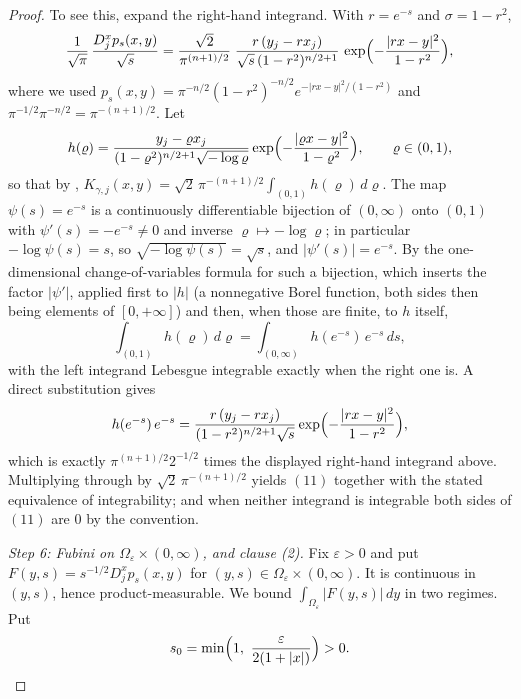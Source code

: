 \begin{proof}
To see this, expand the right-hand integrand.  With $r = e^{-s}$ and
$\sigma = 1-r^2$,
\[
  \frac{1}{\sqrt\pi}\,\frac{D_j^xp_s(x,y)}{\sqrt s}
    = \frac{\sqrt2}{\pi^{(n+1)/2}}\;
      \frac{r\,(y_j-rx_j)}{\sqrt s\,(1-r^2)^{n/2+1}}\,
      \exp\Bigl(-\frac{|rx-y|^2}{1-r^2}\Bigr) ,
\]
where we used $p_s(x,y) = \pi^{-n/2}(1-r^2)^{-n/2}e^{-|rx-y|^2/(1-r^2)}$ and
$\pi^{-1/2}\pi^{-n/2} = \pi^{-(n+1)/2}$.  Let
\[
  h(\varrho) = \frac{y_j - \varrho x_j}{(1-\varrho^2)^{n/2+1}\sqrt{-\log \varrho}}
     \exp\Bigl(-\frac{|\varrho x-y|^2}{1-\varrho^2}\Bigr),
  \qquad \varrho \in (0,1) ,
\]
so that by ,
$K_{\gamma,j}(x,y) = \sqrt2\,\pi^{-(n+1)/2}\int_{(0,1)}h(\varrho)\,d\varrho$.
The map $\psi(s) = e^{-s}$ is a continuously differentiable bijection of
$(0,\infty)$ onto $(0,1)$ with $\psi'(s) = -e^{-s} \neq 0$ and inverse
$\varrho \mapsto -\log\varrho$; in particular $-\log\psi(s) = s$, so
$\sqrt{-\log\psi(s)} = \sqrt s$, and $|\psi'(s)| = e^{-s}$.  By the
one-dimensional change-of-variables formula for such a bijection, which inserts
the factor $|\psi'|$, applied first to $|h|$ (a nonnegative Borel function, both
sides then being elements of $[0,+\infty]$) and then, when those are finite, to
$h$ itself,
\[
  \int_{(0,1)}h(\varrho)\,d\varrho = \int_{(0,\infty)}h(e^{-s})\,e^{-s}\,ds ,
\]
with the left integrand Lebesgue integrable exactly when the right one is.  A
direct substitution gives
\[
  h(e^{-s})\,e^{-s}
    = \frac{r\,(y_j-rx_j)}{(1-r^2)^{n/2+1}\sqrt s}
      \exp\Bigl(-\frac{|rx-y|^2}{1-r^2}\Bigr) ,
\]
which is exactly $\pi^{(n+1)/2}2^{-1/2}$ times the displayed right-hand
integrand above.  Multiplying through by $\sqrt2\,\pi^{-(n+1)/2}$ yields $(11)$
together with the stated equivalence of integrability; and when neither
integrand is integrable both sides of $(11)$ are $0$ by the convention.

\emph{Step 6: Fubini on $\Omega_\varepsilon \times (0,\infty)$, and clause (2).}
Fix $\varepsilon > 0$ and put
$F(y,s) = s^{-1/2}D_j^xp_s(x,y)$ for $(y,s) \in \Omega_\varepsilon\times(0,\infty)$.
It is continuous in $(y,s)$, hence product-measurable.  We bound
$\int_{\Omega_\varepsilon}|F(y,s)|\,dy$ in two regimes.  Put
\[
  s_0 = \min\Bigl(1,\ \frac{\varepsilon}{2(1+|x|)}\Bigr) > 0 .
\]


\end{proof}

